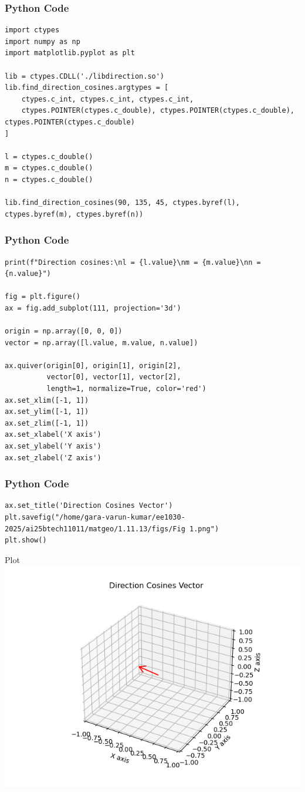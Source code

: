 \documentclass{beamer}
\begin{document}
\begin{frame}[fragile]
    \frametitle{Python Code}
    \begin{lstlisting}
import ctypes
import numpy as np
import matplotlib.pyplot as plt

lib = ctypes.CDLL('./libdirection.so')
lib.find_direction_cosines.argtypes = [
    ctypes.c_int, ctypes.c_int, ctypes.c_int,
    ctypes.POINTER(ctypes.c_double), ctypes.POINTER(ctypes.c_double), ctypes.POINTER(ctypes.c_double)
]

l = ctypes.c_double()
m = ctypes.c_double()
n = ctypes.c_double()

lib.find_direction_cosines(90, 135, 45, ctypes.byref(l), ctypes.byref(m), ctypes.byref(n))
    \end{lstlisting}
\end{frame}

\begin{frame}[fragile]
    \frametitle{Python Code}
    \begin{lstlisting}
print(f"Direction cosines:\nl = {l.value}\nm = {m.value}\nn = {n.value}")

fig = plt.figure()
ax = fig.add_subplot(111, projection='3d')

origin = np.array([0, 0, 0])
vector = np.array([l.value, m.value, n.value])

ax.quiver(origin[0], origin[1], origin[2],
          vector[0], vector[1], vector[2],
          length=1, normalize=True, color='red')
ax.set_xlim([-1, 1])
ax.set_ylim([-1, 1])
ax.set_zlim([-1, 1])
ax.set_xlabel('X axis')
ax.set_ylabel('Y axis')
ax.set_zlabel('Z axis')
    \end{lstlisting}
\end{frame}

\begin{frame}[fragile]
    \frametitle{Python Code}
    \begin{lstlisting}
ax.set_title('Direction Cosines Vector')
plt.savefig("/home/gara-varun-kumar/ee1030-2025/ai25btech11011/matgeo/1.11.13/figs/Fig 1.png")
plt.show()
    \end{lstlisting}
\end{frame}

\begin{frame}{Plot}
    \centering
    \includegraphics[width=\columnwidth, height=0.8\textheight, keepaspectratio]{figs/Fig 1.png}     
\end{frame}
\end{document}
